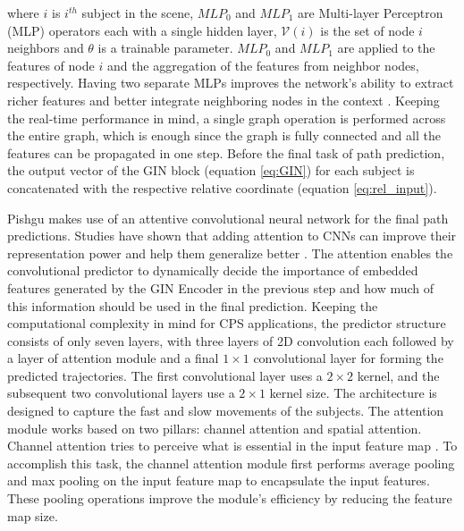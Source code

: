 \documentclass[sigconf]{acmart}
\begin{document}
where $i$ is $i^{th}$ subject in the scene, $MLP_{0}$ and $MLP_{1}$ are Multi-layer Perceptron (MLP) operators each with a single hidden layer, $\mathcal{V}(i)$ is the set of node $i$ neighbors and $\theta$ is a trainable parameter. $MLP_{0}$  and $MLP_{1}$ are applied to the features of node $i$ and the aggregation of the features from neighbor nodes, respectively. Having two separate MLPs improves the network's ability to extract richer features and better integrate neighboring nodes in the context \cite{mendieta2021carpe}. Keeping the real-time performance in mind, a single graph operation is performed across the entire graph, which is enough since the graph is fully connected and all the features can be propagated in one step. Before the final task of path prediction, the output vector of the GIN block (equation \ref{eq:GIN}) for each subject is concatenated with the respective relative coordinate (equation \ref{eq:rel_input}).


Pishgu makes use of an attentive convolutional neural network for the final path predictions. Studies have shown that adding attention to CNNs can improve their representation power and help them generalize better \cite{cbam18}. The attention enables the convolutional predictor to dynamically decide the importance of embedded features generated by the GIN Encoder in the previous step and how much of this information should be used in the final prediction. Keeping the computational complexity in mind for CPS applications, the predictor structure consists of only seven layers, with three layers of 2D convolution each followed by a layer of attention module \cite{cbam18} and a final $1\times1$ convolutional layer for forming the predicted trajectories. The first convolutional layer uses a $2 \times 2$ kernel, and the subsequent two convolutional layers use a $2\times1$ kernel size. The architecture is designed to capture the fast and slow movements of the subjects. The attention module works based on two pillars: channel attention and spatial attention. Channel attention tries to perceive what is essential in the input feature map \cite{NIU202148}. To accomplish this task, the channel attention module first performs average pooling and max pooling on the input feature map to encapsulate the input features. These pooling operations improve the module's efficiency by reducing the feature map size. 
\end{document}

